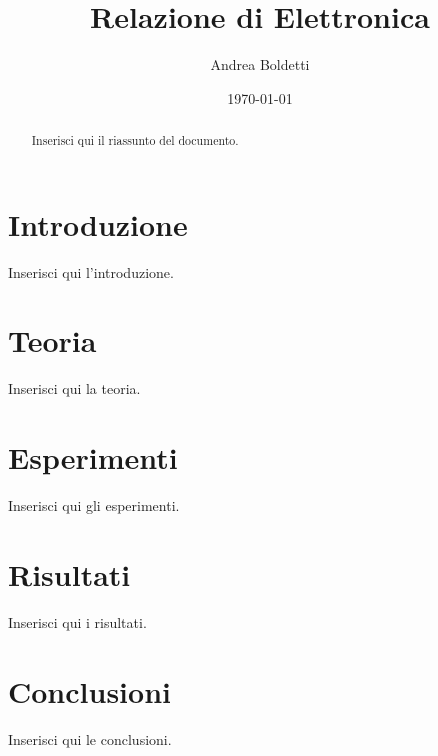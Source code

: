 \documentclass[a4paper,12pt]{article}
\title{Relazione di Elettronica}
\author{Andrea Boldetti}
\date{\today}
\begin{document}
\maketitle

\begin{abstract}
Inserisci qui il riassunto del documento.
\end{abstract}

\newpage
\tableofcontents

\section{Introduzione}
Inserisci qui l'introduzione.

\section{Teoria}
Inserisci qui la teoria.

\section{Esperimenti}
Inserisci qui gli esperimenti.

\section{Risultati}
Inserisci qui i risultati.

\section{Conclusioni}
Inserisci qui le conclusioni.
\end{document}
